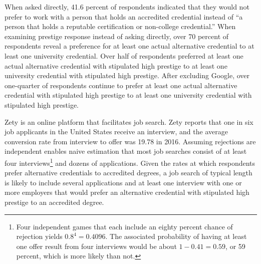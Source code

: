\documentclass[review]{elsarticle}
\begin{document}
When asked directly, 41.6 percent of respondents indicated that they would not prefer to
work with a person that holds an accredited credential instead of ``a person that holds a reputable certification or non-college credential.''
When examining prestige response instead of asking directly, over 70 percent of respondents reveal a preference for
at least one actual alternative credential to at least one university credential.
Over half of respondents preferred at least one actual alternative credential with stipulated high prestige
to at least one university credential with stipulated high prestige.
After excluding Google, over one-quarter of respondents continue to prefer
at least one actual alternative credential with stipulated high prestige to at least one university credential with stipulated high prestige.

Zety is an online platform that facilitates job search.
Zety reports that one in six job applicants in the United States receive an interview,
and the average conversion rate from interview to offer was 19.78 in 2016\cite{turczynski_2021}.
Assuming rejections are independent enables naive estimation that most job searches consist of at least four interviews\footnote{
    Four independent games that each include an eighty percent chance of rejection yields $0.8^4 = 0.4096$.
    The associated probability of having at least one offer result from four interviews would be about $1 - 0.41 = 0.59$,
    or 59 percent, which is more likely than not.
} and dozens of applications.
Given the rates at which respondents prefer alternative credentials to accredited degrees,
a job search of typical length is likely to include several applications and at least one interview
with one or more employers that would prefer an alternative credential with stipulated high prestige to an accredited degree.



\end{document}
